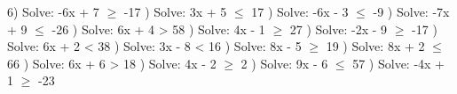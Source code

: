 \documentclass{article}%
\begin{document}
6) Solve: -6x + 7 $\geq$ -17%
\newline%
\newline%
) Solve: 3x + 5 $\leq$ 17%
\newline%
\newline%
) Solve: -6x - 3 $\leq$ -9%
\newline%
\newline%
) Solve: -7x + 9 $\leq$ -26%
\newline%
\newline%
) Solve: 6x + 4 > 58%
\newline%
\newline%
) Solve: 4x - 1 $\geq$ 27%
\newline%
\newline%
) Solve: -2x - 9 $\geq$ -17%
\newline%
\newline%
) Solve: 6x + 2 < 38%
\newline%
\newline%
) Solve: 3x - 8 < 16%
\newline%
\newline%
) Solve: 8x - 5 $\geq$ 19%
\newline%
\newline%
) Solve: 8x + 2 $\leq$ 66%
\newline%
\newline%
) Solve: 6x + 6 > 18%
\newline%
\newline%
) Solve: 4x - 2 $\geq$ 2%
\newline%
\newline%
) Solve: 9x - 6 $\leq$ 57%
\newline%
\newline%
) Solve: -4x + 1 $\geq$ -23%
\newline%
\newline%
\end{document}

